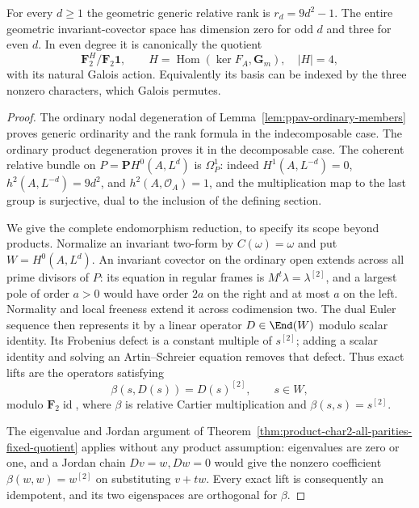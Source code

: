 \begin{proposition}
\label{prop:ordinary-ppav-all-covectors}
For every $d\ge1$ the geometric generic relative rank is $r_d=9d^2-1$.
The entire geometric invariant-covector space has dimension zero for odd $d$
and three for even $d$. In even degree it is canonically the quotient
\[
 \mathbf F_2^{H}/\mathbf F_2\mathbf 1,
 \qquad H=\operatorname{Hom}(\ker F_A,\mathbf G_m),\quad |H|=4,
\]
with its natural Galois action. Equivalently its basis can be indexed by the
three nonzero characters, which Galois permutes.
\end{proposition}
\begin{proof}
The ordinary nodal degeneration of Lemma~\ref{lem:ppav-ordinary-members}
proves generic ordinarity and the rank formula in the indecomposable case.
The ordinary product degeneration proves it in the decomposable case.
The coherent relative bundle on $P=\mathbf P H^0(A,L^d)$ is $\Omega_P^1$:
indeed $H^1(A,L^{-d})=0$, $h^2(A,L^{-d})=9d^2$, and
$h^2(A,\mathcal O_A)=1$, and the multiplication map to the last group is
surjective, dual to the inclusion of the defining section.

We give the complete endomorphism reduction, to specify its scope beyond
products. Normalize an invariant two-form by $C(\omega)=\omega$ and put
$W=H^0(A,L^d)$. An invariant covector on the ordinary open extends across
all prime divisors of $P$: its equation in regular frames is
$M^t\lambda=\lambda^{[2]}$, and a largest pole of order $a>0$ would have
order $2a$ on the right and at most $a$ on the left. Normality and local
freeness extend it across codimension two. The dual Euler sequence then
represents it by a linear operator $D\in\End(W)$ modulo scalar identity.
Its Frobenius defect is a constant multiple of $s^{[2]}$; adding a scalar
identity and solving an Artin--Schreier equation removes that defect.
Thus exact lifts are the operators satisfying
\[
                 \beta(s,D(s))=D(s)^{[2]},\qquad s\in W,
\]
modulo $\mathbf F_2\operatorname{id}$, where $\beta$ is relative Cartier
multiplication and $\beta(s,s)=s^{[2]}$.

The eigenvalue and Jordan argument of
Theorem~\ref{thm:product-char2-all-parities-fixed-quotient} applies without
any product assumption: eigenvalues are zero or one, and a Jordan chain
$Dv=w,Dw=0$ would give the nonzero coefficient $\beta(w,w)=w^{[2]}$ on
substituting $v+tw$. Every exact lift is consequently an idempotent, and
its two eigenspaces are orthogonal for $\beta$.


\end{proof}
